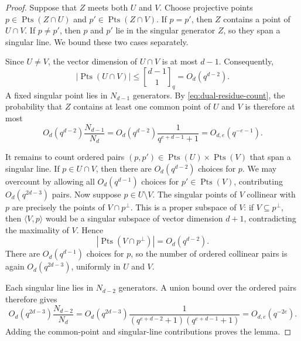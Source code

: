 \documentclass[10pt,a4paper]{amsart}
\newcommand{\Pts}{\operatorname{Pts}}
\newcommand{\qbinom}[2]{\genfrac{[}{]}{0pt}{}{#1}{#2}_q}
\begin{document}
\begin{proof}
Suppose that $Z$ meets both $U$ and $V$.  Choose projective points
$p\in\Pts(Z\cap U)$ and $p'\in\Pts(Z\cap V)$.  If $p=p'$, then $Z$ 
contains
a point of $U\cap V$.  If $p\neq p'$, then $p$ and $p'$ lie in the 
singular
generator $Z$, so they span a singular line.  We bound these two cases
separately.

Since $U\neq V$, the vector dimension of $U\cap V$ is at most $d-1$.
Consequently,
\[
        |\Pts(U\cap V)|\leq\qbinom{d-1}{1}=O_d(q^{d-2}).
\]
A fixed singular point lies in $N_{d-1}$ generators.  By
\eqref{eq:dual-residue-count}, the probability that $Z$ contains at least 
one
common point of $U$ and $V$ is therefore at most
\[
        O_d(q^{d-2})\frac{N_{d-1}}{N_d}
        =O_d(q^{d-2})\frac{1}{q^{e+d-1}+1}
        =O_{d,e}(q^{-e-1}).
\]

It remains to count ordered pairs $(p,p')\in\Pts(U)\times\Pts(V)$ that 
span
a singular line.  If $p\in U\cap V$, then there are $O_d(q^{d-2})$ choices
for $p$.  We may overcount by allowing all $O_d(q^{d-1})$ choices for
$p'\in\Pts(V)$, contributing
$O_d(q^{2d-3})$ pairs.  Now suppose $p\in U\setminus V$.  The singular 
points
of $V$ collinear with $p$ are precisely the points of $V\cap p^\perp$.
This is a proper subspace of $V$: if $V\subseteq p^\perp$, then
$\langle V,p\rangle$ would be a singular subspace of vector dimension
$d+1$, contradicting the maximality of $V$.  Hence
\[
        |\Pts(V\cap p^\perp)|=O_d(q^{d-2}).
\]
There are $O_d(q^{d-1})$ choices for $p$, so the number of ordered 
collinear
pairs is again $O_d(q^{2d-3})$, uniformly in $U$ and $V$.

Each singular line lies in $N_{d-2}$ generators.  A union bound over the
ordered pairs therefore gives
\[
        O_d(q^{2d-3})\frac{N_{d-2}}{N_d}
        =O_d(q^{2d-3})
          \frac{1}{(q^{e+d-2}+1)(q^{e+d-1}+1)}
        =O_{d,e}(q^{-2e}).
\]
Adding the common-point and singular-line contributions proves the lemma.
\end{proof}
\end{document}

